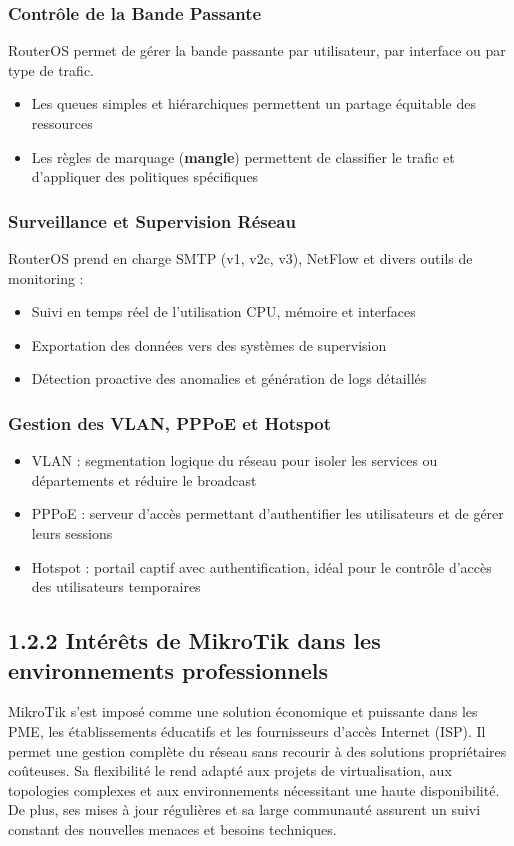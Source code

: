 \subsubsection*{Contrôle de la Bande Passante}
\gls{RouterOS} permet de gérer la bande passante par utilisateur, par interface ou par type de trafic.
\begin{itemize}
    \item Les queues simples et hiérarchiques permettent un partage équitable des ressources
    \item Les règles de marquage (\textbf{mangle}) permettent de classifier le trafic et d’appliquer des politiques spécifiques
\end{itemize}

\subsubsection*{Surveillance et Supervision Réseau}
RouterOS prend en charge \gls{SMTP} (v1, v2c, v3), NetFlow et divers outils de monitoring :
\begin{itemize}
    \item Suivi en temps réel de l’utilisation \gls{CPU}, mémoire et interfaces
    \item Exportation des données vers des systèmes de supervision
    \item Détection proactive des anomalies et génération de logs détaillés
\end{itemize}

\subsubsection*{Gestion des \gls{VLAN}, \gls{PPPoE} et Hotspot}
\begin{itemize}
    \item \gls{VLAN} : segmentation logique du réseau pour isoler les services ou départements et réduire le broadcast
    \item \gls{PPPoE} : serveur d’accès permettant d’authentifier les utilisateurs et de gérer leurs sessions
    \item \gls{Hotspot} : portail captif avec authentification, idéal pour le contrôle d’accès des utilisateurs temporaires
\end{itemize}

\subsection*{1.2.2 Intérêts de MikroTik dans les environnements professionnels}
MikroTik s’est imposé comme une solution économique et puissante dans les 
\gls{PME}, les établissements éducatifs et les fournisseurs d’accès Internet (\gls{ISP}). Il permet 
une gestion complète du réseau sans recourir à des solutions propriétaires coûteuses. 
Sa flexibilité le rend adapté aux projets de virtualisation, aux topologies complexes et 
aux environnements nécessitant une haute disponibilité. De plus, ses mises à jour 
régulières et sa large communauté assurent un suivi constant des nouvelles menaces et 
besoins techniques.

